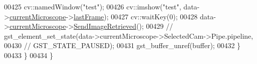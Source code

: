 \begin{DoxyCode}
00425     cv::namedWindow(\textcolor{stringliteral}{"test"});
00426     cv::imshow(\textcolor{stringliteral}{"test"}, data->\hyperlink{struct_hardware_1_1_microscope_1_1___custom_data_a8356f8298aaff0788bac41d1746eaaba}{currentMicroscope}->\hyperlink{class_hardware_1_1_microscope_afd9597ab8447b75fdf5e74783fdcf7b2}{lastFrame});
00427     cv::waitKey(0);
00428     data->\hyperlink{struct_hardware_1_1_microscope_1_1___custom_data_a8356f8298aaff0788bac41d1746eaaba}{currentMicroscope}->\hyperlink{class_hardware_1_1_microscope_ada1437dd2c64a0dc6f8b9e92187108f9}{SendImageRetrieved}();
00429     \textcolor{comment}{//      gst\_element\_set\_state(data->currentMicroscope->SelectedCam->Pipe.pipeline,}
00430     \textcolor{comment}{//                          GST\_STATE\_PAUSED);}
00431     gst\_buffer\_unref(buffer);
00432   \}
00433 \}
00434 \}
\end{DoxyCode}
